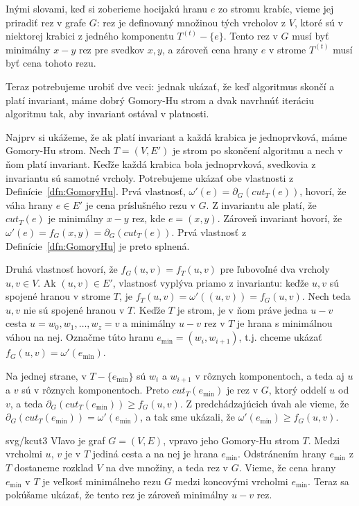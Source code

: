 Inými slovami, keď si zoberieme hocijakú hranu $e$ zo stromu krabíc, vieme jej priradiť rez v grafe $G$: rez je
definovaný množinou tých vrcholov z $V$, ktoré sú v niektorej krabici z jedného komponentu $T^{(t)}-\{e\}$.
Tento rez v $G$ musí byť minimálny $x-y$ rez pre svedkov $x,y$, a zároveň cena hrany $e$ v strome $T^{(t)}$
musí byť cena tohoto rezu.

Teraz potrebujeme urobiť dve veci: jednak ukázať, že keď algoritmus skončí a platí invariant, máme dobrý 
Gomory-Hu strom a dvak navrhnúť iteráciu algoritmu tak, aby invariant ostával v platnosti.

Najprv si ukážeme, že ak platí invariant a každá krabica je jednoprvková, máme Gomory-Hu strom. 
Nech $T=(V,E')$ je strom po skončení algoritmu a nech v ňom platí invariant. Keďže každá krabica bola jednoprvková,
svedkovia z invariantu sú samotné vrcholy.
Potrebujeme ukázať
obe vlastnosti z Definície~\ref{dfn:GomoryHu}. Prvá vlastnosť, $\omega'(e)=\partial_G(cut_T(e))$,  hovorí, 
že váha hrany $e\in E'$ je cena príslušného rezu v $G$. Z invariantu ale platí, že $cut_T(e)$ je minimálny
$x-y$ rez, kde $e=(x,y)$. Zároveň invariant hovorí, že $\omega'(e)=f_G(x,y)=\partial_G(cut_T(e))$.
Prvá vlastnosť z Definície~\ref{dfn:GomoryHu} je preto splnená. 

Druhá vlastnosť hovorí, že $f_G(u,v)=f_T(u,v)$
pre ľubovoľné dva vrcholy $u,v\in V$. Ak $(u,v)\in E'$, vlastnosť vyplýva priamo z invariantu:
keďže $u,v$ sú spojené hranou v strome $T$, je $f_T(u,v)=\omega'((u,v))=f_G(u,v)$.
Nech teda $u,v$ nie sú spojené hranou v $T$. Keďže $T$ je strom, je v ňom práve jedna $u-v$ cesta
$u=w_0,w_1,\ldots,w_z=v$ a minimálny $u-v$ rez v $T$ je hrana s minimálnou váhou na nej.
Označme túto hranu $e_{\min}=(w_i,w_{i+1})$, t.j. chceme ukázať $f_G(u,v)=\omega'(e_{\min})$.

Na jednej strane, v $T-\{e_{\min}\}$ sú $w_{i}$ a $w_{i+1}$ v rôznych komponentoch, a teda aj $u$ a $v$
sú v rôznych komponentoch. Preto $cut_T(e_{\min})$ je rez v $G$, ktorý oddelí $u$
od $v$, a teda $\partial_G(cut_T(e_{\min}))\ge f_G(u,v)$. Z predchádzajúcich úvah ale vieme,
že $\partial_G(cut_T(e_{\min}))=\omega'(e_{\min})$, a tak sme ukázali, že $\omega'(e_{\min})\ge  f_G(u,v)$.

\begin{myfig}{\textwidth}{svg/kcut3}
  Vľavo je graf $G=(V,E)$, vpravo jeho Gomory-Hu strom $T$. Medzi vrcholmi $u$, $v$ je v $T$ jediná cesta
a na nej je hrana $e_{\min}$. Odstránením hrany $e_{\min}$ z $T$ dostaneme rozklad $V$ na dve množiny,
a teda rez v $G$. Vieme, že cena hrany $e_{\min}$ v $T$ je veľkosť minimálneho rezu $G$ medzi
koncovými vrcholmi $e_{\min}$. Teraz sa pokúšame ukázať, že tento rez je zároveň minimálny $u-v$ rez.
\end{myfig}


